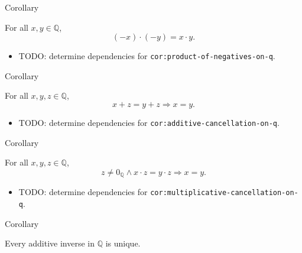 \begin{corollarybox}{Corollary}
\begin{corollary}
\label{cor:product-of-negatives-on-q}
For all $x,y\in\mathbb{Q}$,
\[
(-x)\cdot(-y)=x\cdot y.
\]
\end{corollary}
\end{corollarybox}

\begin{dependencies}
\begin{itemize}
  \item TODO: determine dependencies for \texttt{cor:product-of-negatives-on-q}.
\end{itemize}
\end{dependencies}

\begin{corollarybox}{Corollary}
\begin{corollary}
\label{cor:additive-cancellation-on-q}
For all $x,y,z\in\mathbb{Q}$,
\[
x+z=y+z
\Longrightarrow
x=y.
\]
\end{corollary}
\end{corollarybox}

\begin{dependencies}
\begin{itemize}
  \item TODO: determine dependencies for \texttt{cor:additive-cancellation-on-q}.
\end{itemize}
\end{dependencies}

\begin{corollarybox}{Corollary}
\begin{corollary}
\label{cor:multiplicative-cancellation-on-q}
For all $x,y,z\in\mathbb{Q}$,
\[
z\ne 0_{\mathbb{Q}}\land x\cdot z=y\cdot z
\Longrightarrow
x=y.
\]
\end{corollary}
\end{corollarybox}

\begin{dependencies}
\begin{itemize}
  \item TODO: determine dependencies for \texttt{cor:multiplicative-cancellation-on-q}.
\end{itemize}
\end{dependencies}

\begin{corollarybox}{Corollary}
\begin{corollary}
\label{cor:uniqueness-additive-inverse-on-q}
Every additive inverse in $\mathbb{Q}$ is unique.
\end{corollary}
\end{corollarybox}

